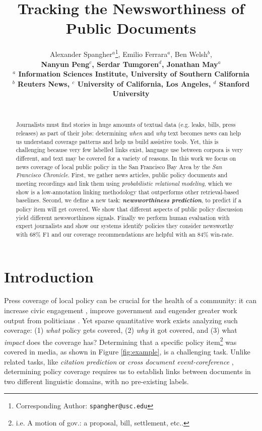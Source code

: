 \documentclass[11pt]{article}
\title{Tracking the Newsworthiness of Public Documents}
\author{Alexander Spangher$^a$\thanks{Corresponding Author: \texttt{spangher@usc.edu}}, Emilio Ferrara$^a$, Ben Welsh$^b$, \\ \bf Nanyun Peng$^c$, Serdar Tumgoren$^d$, Jonathan May$^a$ \\
  $^a$ Information Sciences Institute, University of Southern California \\
  $^b$ Reuters News, $^c$ University of California, Los Angeles, $^d$ Stanford University \\
  \\}
\begin{document}
\maketitle
\begin{abstract}

Journalists must find stories in huge amounts of textual data (e.g. leaks, bills, press releases) as part of their jobs: determining \textit{when} and \textit{why} text  becomes news can help us understand coverage patterns and help us build assistive tools. Yet, this is challenging because very few labelled links exist, language use between corpora is very different, and text may be covered for a variety of reasons.
In this work we focus on news coverage of local public policy in the San Francisco Bay Area by the \textit{San Francisco Chronicle}. 
First, we gather news articles, public policy documents and meeting recordings and link them using \textit{probabilistic relational modeling}, which we show is a low-annotation linking methodology that outperforms other retrieval-based baselines. 
Second, we define a new task: \textbf{\textit{newsworthiness prediction}}, to predict if a policy item will get covered. We show that different aspects of public policy discussion yield different newsworthiness signals. 
Finally we perform human evaluation with expert journalists and show our systems identify policies they consider newsworthy with 68\% F1 and our coverage recommendations are helpful with an 84\% win-rate.


\end{abstract}

\vspace{.3cm}
\section{Introduction}

Press coverage of local policy can be crucial for the health of a community: it can increase civic engagement \cite{smith1987effects}, improve government \cite{bruns2011newspaper} and engender greater work output from politicians \cite{snyder2010press}. 
Yet sparse quantitative work exists analyzing such coverage: (1) \textit{what} policy gets covered, (2) \textit{why} it got covered, and (3) what \textit{impact} does the coverage has?
Determining that a specific policy item\footnote{i.e. A motion of gov.: a proposal, bill, 
settlement, 
etc..} was covered in media, as shown in Figure \ref{fig:example}, is a challenging task. Unlike related tasks, like \textit{citation prediction} \cite{shibata2012link} or \textit{cross document event-coreference} \cite{bagga1999cross}, determining policy coverage requires us to establish links between documents in two different linguistic domains, with no pre-existing labels.
\end{document}
